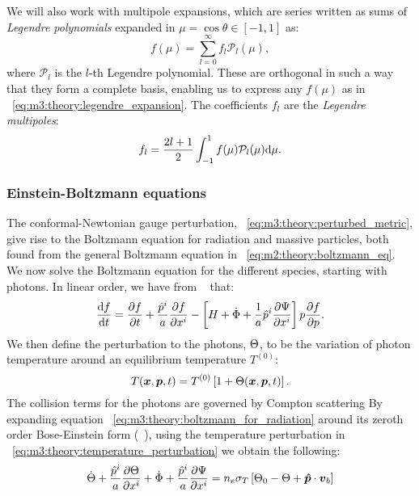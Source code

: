     We will also work with multipole expansions, which are series written as sums of \textit{Legendre polynomials} expanded in $\mu=\cos{\theta}\in[-1,1]$ as:
    \begin{equation}\label{eq:m3:theory:legendre_expansion}
        f(\mu) = \sum_{l=0}^{\infty}f_l\mathcal{P}_l(\mu),
    \end{equation}
    where $\mathcal{P}_l$ is the $l$-th Legendre polynomial. These are orthogonal in such a way that they form a complete basis, enabling us to express any $f(\mu)$ as in ~\cref{eq:m3:theory:legendre_expansion}. The coefficients $f_l$ are the \textit{Legendre multipoles}:
    \begin{equation}\label{eq:m3:theory:legendre_coeff}
        f_l = \frac{2l+1}{2}\int_{-1}^1f(\mu)\mathcal{P}_l(\mu)\mathrm{d}\mu.
    \end{equation}




\subsubsection{Einstein-Boltzmann equations}
    The conformal-Newtonian gauge perturbation, ~\cref{eq:m3:theory:perturbed_metric}, give rise to the Boltzmann equation for radiation and massive particles, both found from the general Boltzmann equation in ~\cref{eq:m2:theory:boltzmann_eq}. We now solve the Boltzmann equation for the different species, starting with photons. In linear order, we have from ~\cite[Eq. 3.74]{dodelson2020modern} that:
    \begin{equation}\label{eq:m3:theory:boltzmann_for_radiation}
        \dv{f}{t} = \pdv{f}{t}+\frac{\hat{p}^i}{a}\pdv{f}{x^i}-\left[H+\dot{\Phi} + \frac{1}{a}\hat{p}^i\pdv{\Psi}{x^i}\right]p\pdv{f}{p}.
    \end{equation}
    We then define the perturbation to the photons, $\Theta$, to be the variation of photon temperature around an equilibrium temperature $T^{(0)}$:
    \begin{equation}\label{eq:m3:theory:temperature_perturbation}
        T(\boldsymbol{x}, \boldsymbol{p}, t) = T^{(0)}\left[1+\Theta(\boldsymbol{x}, \boldsymbol{p}, t)\right].
    \end{equation}
    The collision terms for the photons are governed by Compton scattering 
    By expanding equation ~\cref{eq:m3:theory:boltzmann_for_radiation} around its zeroth order Bose-Einstein form (~\cite{dodelson2020modern}), using the temperature perturbation in ~\cref{eq:m3:theory:temperature_perturbation} we obtain the following:
    \begin{equation}
        \dot{\Theta} + \frac{\hat{p}^i}{a}\pdv{\Theta}{x^i} + \dot{\Phi} + \frac{\hat{p}^i}{a}\pdv{\Psi}{x^i} = n_e\sigma_T\left[\Theta_0-\Theta+\boldsymbol{\hat{p}}\cdot\boldsymbol{v}_b\right]
    \end{equation} 



